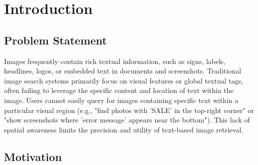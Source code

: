 \documentclass[sigconf,screen]{acmart}
\begin{document}



\maketitle

\section{Introduction}

\subsection{Problem Statement}

Images frequently contain rich textual information, such as signs, labels, headlines, logos, or embedded text in documents and screenshots. Traditional image search systems primarily focus on visual features or global textual tags, often failing to leverage the specific content and location of text within the image. Users cannot easily query for images containing specific text within a particular visual region (e.g., "find photos with 'SALE' in the top-right corner" or "show screenshots where 'error message' appears near the bottom"). This lack of spatial awareness limits the precision and utility of text-based image retrieval.

\subsection{Motivation}
\end{document}
